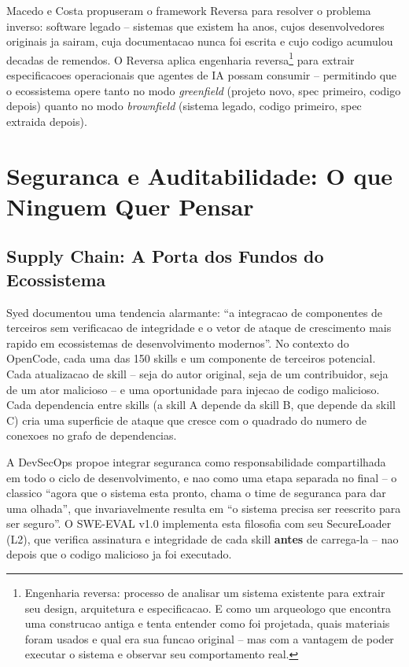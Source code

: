 \documentclass[12pt,a4paper,oneside,sumario=tradicional,chapter=TITLE,section=TITLE,subsection=TITLE,english,brazil]{abntex2}
\begin{document}
Macedo e Costa \cite{macedo2026reversa} propuseram o framework Reversa para resolver o problema inverso: software legado -- sistemas que existem ha anos, cujos desenvolvedores originais ja sairam, cuja documentacao nunca foi escrita e cujo codigo acumulou decadas de remendos. O Reversa aplica engenharia reversa\footnote{Engenharia reversa: processo de analisar um sistema existente para extrair seu design, arquitetura e especificacao. E como um arqueologo que encontra uma construcao antiga e tenta entender como foi projetada, quais materiais foram usados e qual era sua funcao original -- mas com a vantagem de poder executar o sistema e observar seu comportamento real.} para extrair especificacoes operacionais que agentes de IA possam consumir -- permitindo que o ecossistema opere tanto no modo \textit{greenfield} (projeto novo, spec primeiro, codigo depois) quanto no modo \textit{brownfield} (sistema legado, codigo primeiro, spec extraida depois).

\section{Seguranca e Auditabilidade: O que Ninguem Quer Pensar}

\subsection{Supply Chain: A Porta dos Fundos do Ecossistema}

Syed \cite{syed2024emerging} documentou uma tendencia alarmante: ``a integracao de componentes de terceiros sem verificacao de integridade e o vetor de ataque de crescimento mais rapido em ecossistemas de desenvolvimento modernos''. No contexto do OpenCode, cada uma das 150 skills e um componente de terceiros potencial. Cada atualizacao de skill -- seja do autor original, seja de um contribuidor, seja de um ator malicioso -- e uma oportunidade para injecao de codigo malicioso. Cada dependencia entre skills (a skill A depende da skill B, que depende da skill C) cria uma superficie de ataque que cresce com o quadrado do numero de conexoes no grafo de dependencias.

A DevSecOps \cite{syed2024devsecops} propoe integrar seguranca como responsabilidade compartilhada em todo o ciclo de desenvolvimento, e nao como uma etapa separada no final -- o classico ``agora que o sistema esta pronto, chama o time de seguranca para dar uma olhada'', que invariavelmente resulta em ``o sistema precisa ser reescrito para ser seguro''. O SWE-EVAL v1.0 implementa esta filosofia com seu SecureLoader (L2), que verifica assinatura e integridade de cada skill \textbf{antes} de carrega-la -- nao depois que o codigo malicioso ja foi executado.
\end{document}
